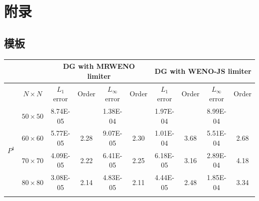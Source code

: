 \documentclass{book}
\begin{document}
\chapter{附录}
\section{模板}
\begin{table}[ht]
  \small
  \centering
  \begin{tabular}{|c|c|cccc|cccc|}
    \hline
                           &                 & \multicolumn{4}{c|}{DG   with MRWENO limiter} & \multicolumn{4}{c|}{DG   with WENO-JS limiter}                                                                                                                                                                 \\ \hline
                           & $N\times N$     & \multicolumn{1}{c|}{$L_1$ error}              & \multicolumn{1}{c|}{Order}                     & \multicolumn{1}{c|}{$L_\infty$ error} & Order & \multicolumn{1}{c|}{$L_1$ error} & \multicolumn{1}{c|}{Order} & \multicolumn{1}{c|}{$L_\infty$ error} & Order \\ \hline
    \multirow{6}{*}{$P^1$} & $50\times 50$   & \multicolumn{1}{c|}{8.74E-05}                 & \multicolumn{1}{c|}{}                          & \multicolumn{1}{c|}{1.38E-04}         &       & \multicolumn{1}{c|}{1.97E-04}    & \multicolumn{1}{c|}{}      & \multicolumn{1}{c|}{8.99E-04}         &       \\ \cline{2-10}
                           & $60\times 60$   & \multicolumn{1}{c|}{5.77E-05}                 & \multicolumn{1}{c|}{2.28}                      & \multicolumn{1}{c|}{9.07E-05}         & 2.30  & \multicolumn{1}{c|}{1.01E-04}    & \multicolumn{1}{c|}{3.68}  & \multicolumn{1}{c|}{5.51E-04}         & 2.68  \\ \cline{2-10}
                           & $70\times 70$   & \multicolumn{1}{c|}{4.09E-05}                 & \multicolumn{1}{c|}{2.22}                      & \multicolumn{1}{c|}{6.41E-05}         & 2.25  & \multicolumn{1}{c|}{6.18E-05}    & \multicolumn{1}{c|}{3.16}  & \multicolumn{1}{c|}{2.89E-04}         & 4.18  \\ \cline{2-10}
                           & $80\times 80$   & \multicolumn{1}{c|}{3.08E-05}                 & \multicolumn{1}{c|}{2.14}                      & \multicolumn{1}{c|}{4.83E-05}         & 2.11  & \multicolumn{1}{c|}{4.44E-05}    & \multicolumn{1}{c|}{2.48}  & \multicolumn{1}{c|}{1.85E-04}         & 3.34  \\ \cline{2-10}

\end{tabular}
\end{table}
\end{document}
